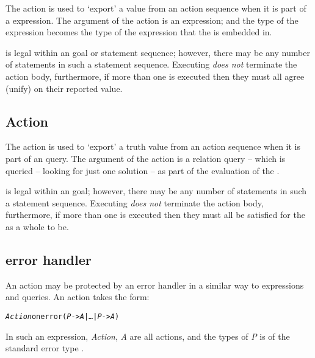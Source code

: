 The  action is used to `export' a value from an action sequence when it is part of a  expression. The argument of the  action is an expression; and the type of the expression becomes the type of the  expression that the  is embedded in.

 is legal within an  goal or  statement sequence; however, there may be any number of  statements in such a statement sequence. Executing  \emph{does not} terminate the action body, furthermore, if more than one  is executed then they must all agree (unify) on their reported value.


\subsection{ Action}
\label{action:istrue}

The  action is used to `export' a truth value from an action sequence when it is part of an  query. The argument of the  action is a relation query -- which is queried -- looking for just one solution -- as part of the evaluation of the .

 is legal within an  goal; however, there may be any number of  statements in such a statement sequence. Executing  \emph{does not} terminate the action body, furthermore, if more than one  is executed then they must all be satisfied for the  as a whole to be.

\subsection{error handler}
\label{action:errorhandler}

An action may be protected by an error handler in a similar way to expressions and queries. An  action takes the form:

\begin{alltt}
\emph{Action} onerror (\emph{P} -> \emph{A} | \ldots{} | \emph{P\subn} -> \emph{A\subn})
\end{alltt}
In such an expression, \emph{Action}, \emph{A\subi} are all actions, and the types of \emph{P\subi} is of the standard error type .

